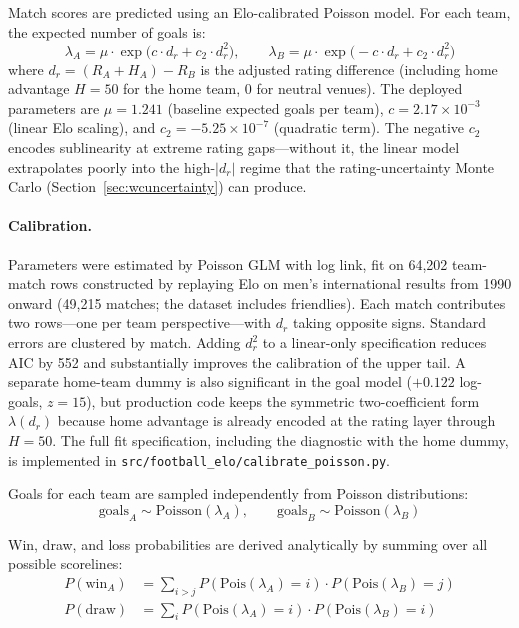 \documentclass[11pt]{article}
\begin{document}
Match scores are predicted using an Elo-calibrated Poisson model. For each team, the expected number of goals is:
\begin{equation}
\lambda_A = \mu \cdot \exp\!\big(c \cdot d_r + c_2 \cdot d_r^2\big), \qquad \lambda_B = \mu \cdot \exp\!\big(-c \cdot d_r + c_2 \cdot d_r^2\big)
\label{eq:poisson}
\end{equation}
where $d_r = (R_A + H_A) - R_B$ is the adjusted rating difference (including home advantage $H = 50$ for the home team, $0$ for neutral venues). The deployed parameters are $\mu = 1.241$ (baseline expected goals per team), $c = 2.17 \times 10^{-3}$ (linear Elo scaling), and $c_2 = -5.25 \times 10^{-7}$ (quadratic term). The negative $c_2$ encodes sublinearity at extreme rating gaps---without it, the linear model extrapolates poorly into the high-$|d_r|$ regime that the rating-uncertainty Monte Carlo (Section~\ref{sec:wcuncertainty}) can produce.

\paragraph{Calibration.} Parameters were estimated by Poisson GLM with log link, fit on 64,202 team-match rows constructed by replaying Elo on men's international results from 1990 onward (49,215 matches; the dataset includes friendlies). Each match contributes two rows---one per team perspective---with $d_r$ taking opposite signs. Standard errors are clustered by match. Adding $d_r^2$ to a linear-only specification reduces AIC by 552 and substantially improves the calibration of the upper tail. A separate home-team dummy is also significant in the goal model ($+0.122$ log-goals, $z = 15$), but production code keeps the symmetric two-coefficient form $\lambda(d_r)$ because home advantage is already encoded at the rating layer through $H = 50$. The full fit specification, including the diagnostic with the home dummy, is implemented in \texttt{src/football\_elo/calibrate\_poisson.py}.

Goals for each team are sampled independently from Poisson distributions:
\[
\text{goals}_A \sim \text{Poisson}(\lambda_A), \qquad \text{goals}_B \sim \text{Poisson}(\lambda_B)
\]

Win, draw, and loss probabilities are derived analytically by summing over all possible scorelines:
\begin{align}
P(\text{win}_A) &= \sum_{i > j} P(\text{Pois}(\lambda_A) = i) \cdot P(\text{Pois}(\lambda_B) = j) \\
P(\text{draw}) &= \sum_{i} P(\text{Pois}(\lambda_A) = i) \cdot P(\text{Pois}(\lambda_B) = i)
\end{align}
\end{document}

